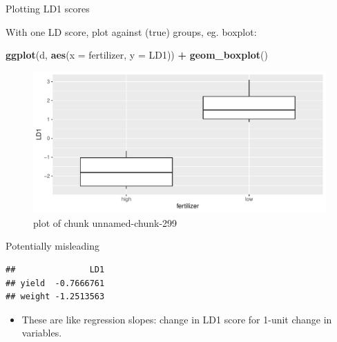 \documentclass[ignorenonframetext,]{beamer}
\newenvironment{Shaded}{\begin{snugshade}}{\end{snugshade}}
\newcommand{\DataTypeTok}[1]{\textcolor[rgb]{0.13,0.29,0.53}{#1}}
\newcommand{\FloatTok}[1]{\textcolor[rgb]{0.00,0.00,0.81}{#1}}
\newcommand{\KeywordTok}[1]{\textcolor[rgb]{0.13,0.29,0.53}{\textbf{#1}}}
\newcommand{\NormalTok}[1]{#1}
\newcommand{\OperatorTok}[1]{\textcolor[rgb]{0.81,0.36,0.00}{\textbf{#1}}}
\newcommand{\StringTok}[1]{\textcolor[rgb]{0.31,0.60,0.02}{#1}}
\providecommand{\tightlist}{%
  \setlength{\itemsep}{0pt}\setlength{\parskip}{0pt}}
\begin{document}
\begin{frame}[fragile]{Plotting LD1 scores}
\protect\hypertarget{plotting-ld1-scores}{}

With one LD score, plot against (true) groups, eg. boxplot:

\begin{Shaded}
\begin{Highlighting}[]
\KeywordTok{ggplot}\NormalTok{(d, }\KeywordTok{aes}\NormalTok{(}\DataTypeTok{x =}\NormalTok{ fertilizer, }\DataTypeTok{y =}\NormalTok{ LD1)) }\OperatorTok{+}\StringTok{ }\KeywordTok{geom_boxplot}\NormalTok{()}
\end{Highlighting}
\end{Shaded}

\begin{figure}
\centering
\includegraphics{figure/unnamed-chunk-299-1.pdf}
\caption{plot of chunk unnamed-chunk-299}
\end{figure}

\end{frame}

\begin{frame}[fragile]{Potentially misleading}
\protect\hypertarget{potentially-misleading}{}

\begin{Shaded}
\end{Shaded}

\begin{verbatim}
##               LD1
## yield  -0.7666761
## weight -1.2513563
\end{verbatim}

\begin{itemize}
\tightlist
\item
  These are like regression slopes: change in LD1 score for 1-unit
  change in variables.
\end{itemize}

\end{frame}
\end{document}

